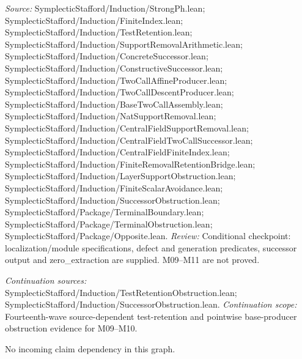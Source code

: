 \emph{Source:} SymplecticStafford/Induction/StrongPh.lean; SymplecticStafford/Induction/FiniteIndex.lean; SymplecticStafford/Induction/TestRetention.lean; SymplecticStafford/Induction/SupportRemovalArithmetic.lean; SymplecticStafford/Induction/ConcreteSuccessor.lean; SymplecticStafford/Induction/ConstructiveSuccessor.lean; SymplecticStafford/Induction/TwoCallAffineProducer.lean; SymplecticStafford/Induction/TwoCallDescentProducer.lean; SymplecticStafford/Induction/BaseTwoCallAssembly.lean; SymplecticStafford/Induction/NatSupportRemoval.lean; SymplecticStafford/Induction/CentralFieldSupportRemoval.lean; SymplecticStafford/Induction/CentralFieldTwoCallSuccessor.lean; SymplecticStafford/Induction/CentralFieldFiniteIndex.lean; SymplecticStafford/Induction/FiniteRemovalRetentionBridge.lean; SymplecticStafford/Induction/LayerSupportObstruction.lean; SymplecticStafford/Induction/FiniteScalarAvoidance.lean; SymplecticStafford/Induction/SuccessorObstruction.lean; SymplecticStafford/Package/TerminalBoundary.lean; SymplecticStafford/Package/TerminalObstruction.lean; SymplecticStafford/Package/Opposite.lean.
\emph{Review:} Conditional checkpoint: localization/module specifications, defect and generation predicates, successor output and zero\_extraction are supplied. M09–M11 are not proved.

\emph{Continuation sources:} SymplecticStafford/Induction/TestRetentionObstruction.lean; SymplecticStafford/Induction/SuccessorObstruction.lean.
\emph{Continuation scope:} Fourteenth-wave source-dependent test-retention and pointwise base-producer obstruction evidence for M09--M10.

No incoming claim dependency in this graph.
